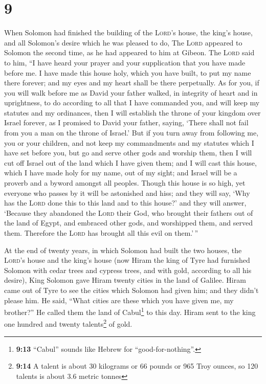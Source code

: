 \hypertarget{section-8}{%
\section{9}\label{section-8}}

 When Solomon had finished the building of the
\textsc{Lord}'s house, the king's house, and all Solomon's desire which
he was pleased to do,  The \textsc{Lord} appeared to
Solomon the second time, as he had appeared to him at Gibeon.
 The \textsc{Lord} said to him, ``I have heard your prayer
and your supplication that you have made before me. I have made this
house holy, which you have built, to put my name there forever; and my
eyes and my heart shall be there perpetually.  As for you,
if you will walk before me as David your father walked, in integrity of
heart and in uprightness, to do according to all that I have commanded
you, and will keep my statutes and my ordinances,  then I
will establish the throne of your kingdom over Israel forever, as I
promised to David your father, saying, `There shall not fail from you a
man on the throne of Israel.'  But if you turn away from
following me, you or your children, and not keep my commandments and my
statutes which I have set before you, but go and serve other gods and
worship them,  then I will cut off Israel out of the land
which I have given them; and I will cast this house, which I have made
holy for my name, out of my sight; and Israel will be a proverb and a
byword amongst all peoples.  Though this house is so high,
yet everyone who passes by it will be astonished and hiss; and they will
say, `Why has the \textsc{Lord} done this to this land and to this
house?'  and they will answer, `Because they abandoned the
\textsc{Lord} their God, who brought their fathers out of the land of
Egypt, and embraced other gods, and worshipped them, and served them.
Therefore the \textsc{Lord} has brought all this evil on them.'\,''

 At the end of twenty years, in which Solomon had built
the two houses, the \textsc{Lord}'s house and the king's house
 (now Hiram the king of Tyre had furnished Solomon with
cedar trees and cypress trees, and with gold, according to all his
desire), King Solomon gave Hiram twenty cities in the land of Galilee.
 Hiram came out of Tyre to see the cities which Solomon
had given him; and they didn't please him.  He said,
``What cities are these which you have given me, my brother?'' He called
them the land of Cabul\footnote{\textbf{9:13} ``Cabul'' sounds like
  Hebrew for ``good-for-nothing''.} to this day.  Hiram
sent to the king one hundred and twenty talents\footnote{\textbf{9:14} A
  talent is about 30 kilograms or 66 pounds or 965 Troy ounces, so 120
  talents is about 3.6 metric tonnes} of gold.

